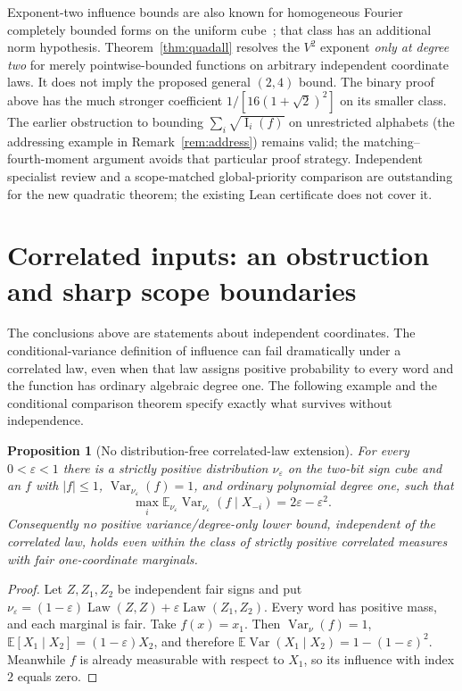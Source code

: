 \documentclass[11pt]{article}
\numberwithin{equation}{section}
\newtheorem{proposition}[theorem]{Proposition}
\theoremstyle{remark}
\newcommand{\Inf}{\operatorname{I}}
\begin{document}
Exponent-two influence bounds are also known for homogeneous Fourier completely bounded forms on the uniform cube~\cite[Theorem~1.6]{EG23}; that class has an additional norm hypothesis. Theorem~\ref{thm:quadall} resolves the $V^2$ exponent \emph{only at degree two} for merely pointwise-bounded functions on arbitrary independent coordinate laws. It does not imply the proposed general $(2,4)$ bound. The binary proof above has the much stronger coefficient $1/[16(1+\sqrt2)^2]$ on its smaller class. The earlier obstruction to bounding $\sum_i\sqrt{\Inf_i(f)}$ on unrestricted alphabets (the addressing example in Remark~\ref{rem:address}) remains valid; the matching--fourth-moment argument avoids that particular proof strategy. Independent specialist review and a scope-matched global-priority comparison are outstanding for the new quadratic theorem; the existing Lean certificate does not cover it.



\section{Correlated inputs: an obstruction and sharp scope boundaries}\label{sec:correlated}
The conclusions above are statements about independent coordinates. The
conditional-variance definition of influence can fail dramatically under
a correlated law, even when that law assigns positive probability to every
word and the function has ordinary algebraic degree one. The following
example and the conditional comparison theorem specify exactly what
survives without independence.

\begin{proposition}[No distribution-free correlated-law extension]\label{prop:corrno}
For every $0<\varepsilon<1$ there is a strictly positive distribution
$\nu_\varepsilon$ on the two-bit sign cube and an $f$ with $|f|\le1$,
$\operatorname{Var}_{\nu_\varepsilon}(f)=1$, and ordinary polynomial
degree one, such that
\[
 \max_i\mathbb E_{\nu_\varepsilon}
   \operatorname{Var}_{\nu_\varepsilon}(f\mid X_{-i})
 =2\varepsilon-\varepsilon^2.
\]
Consequently no positive variance/degree-only lower bound, independent of
the correlated law, holds even within the class of strictly positive
correlated measures with fair one-coordinate marginals.
\end{proposition}
\begin{proof}
Let $Z,Z_1,Z_2$ be independent fair signs and put
$\nu_\varepsilon=(1-\varepsilon)\operatorname{Law}(Z,Z)
+\varepsilon\operatorname{Law}(Z_1,Z_2)$.
Every word has positive mass, and each marginal is fair. Take $f(x)=x_1$.
Then $\operatorname{Var}_\nu(f)=1$, $\mathbb E[X_1\mid X_2]
=(1-\varepsilon)X_2$, and therefore
$\mathbb E\operatorname{Var}(X_1\mid X_2)
=1-(1-\varepsilon)^2$. Meanwhile $f$ is already measurable
with respect to $X_1$, so its influence with index $2$ equals zero.
\end{proof}
\end{document}
